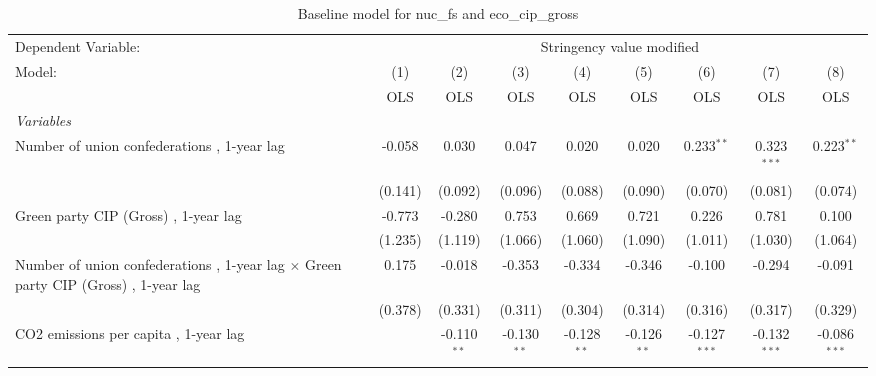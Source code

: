 
\begin{table}[htbp]
   \caption{Baseline model for nuc\_fs and eco\_cip\_gross}
   \centering
   \begin{tabular}{lcccccccc}
      \toprule
      Dependent Variable: & \multicolumn{8}{c}{Stringency value modified}\\
      Model:                                                                                     & (1)     & (2)           & (3)           & (4)           & (5)           & (6)            & (7)            & (8)\\  
                                                                                                 &  OLS    & OLS           & OLS           & OLS           & OLS           & OLS            & OLS            & OLS\\  
      \midrule
      \emph{Variables}\\
      Number of union confederations , 1-year lag                                                & -0.058  & 0.030         & 0.047         & 0.020         & 0.020         & 0.233$^{**}$   & 0.323$^{***}$  & 0.223$^{**}$\\   
                                                                                                 & (0.141) & (0.092)       & (0.096)       & (0.088)       & (0.090)       & (0.070)        & (0.081)        & (0.074)\\   
      Green party CIP (Gross) , 1-year lag                                                       & -0.773  & -0.280        & 0.753         & 0.669         & 0.721         & 0.226          & 0.781          & 0.100\\   
                                                                                                 & (1.235) & (1.119)       & (1.066)       & (1.060)       & (1.090)       & (1.011)        & (1.030)        & (1.064)\\   
      Number of union confederations , 1-year lag $\times$ Green party CIP (Gross) , 1-year lag  & 0.175   & -0.018        & -0.353        & -0.334        & -0.346        & -0.100         & -0.294         & -0.091\\   
                                                                                                 & (0.378) & (0.331)       & (0.311)       & (0.304)       & (0.314)       & (0.316)        & (0.317)        & (0.329)\\   
      CO2 emissions per capita , 1-year lag                                                      &         & -0.110$^{**}$ & -0.130$^{**}$ & -0.128$^{**}$ & -0.126$^{**}$ & -0.127$^{***}$ & -0.132$^{***}$ & -0.086$^{***}$\\   

\end{tabular}
\end{table}
